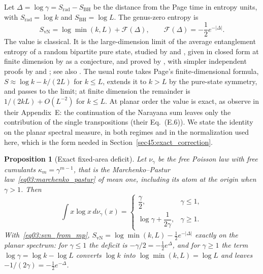 \documentclass[11pt,letterpaper]{article}
\theoremstyle{plain}
\newtheorem{proposition}[theorem]{Proposition}
\theoremstyle{definition}
\theoremstyle{remark}
\begin{document}
Let $\Delta = \log\gamma = S_{\mathrm{rad}} - S_{\mathrm{BH}}$ be the distance from the Page time in entropy units, with $S_{\mathrm{rad}} = \log k$ and $S_{\mathrm{BH}} = \log L$. The genus-zero entropy is
\begin{equation}
\label{eq03:pssy_scaling_function}
S_{\mathrm{vN}} = \log\min(k,L) + \mathcal{F}(\Delta), \qquad
\mathcal{F}(\Delta) = -\frac{1}{2} e^{-|\Delta|} .
\end{equation}
The value is classical. It is the large-dimension limit of the average entanglement entropy of a random bipartite pure state, studied by \citet{lubkin1978} and \citet{lloydpagels1988}, given in closed form at finite dimension by \citet{page1993entropy} as a conjecture, and proved by \citet{foongkanno1994}, with simpler independent proofs by \citet{sanchezruiz1995} and \citet{sen1996}; see also \citet{zyczkowskisommers2001}. The usual route takes Page's finite-dimensional formula, $S \approx \log k - k/(2L)$ for $k \le L$, extends it to $k > L$ by the pure-state symmetry, and passes to the limit; at finite dimension the remainder is $1/(2kL) + O(L^{-2})$ for $k \le L$. At planar order the value is exact, as \citet{pssyetal2022} observe in their Appendix~E: the continuation of the Narayana sum leaves only the contribution of the single transpositions (their Eq.~(E.6)). We state the identity on the planar spectral measure, in both regimes and in the normalization used here, which is the form needed in Section~\ref{sec45:exact_correction}.

\begin{proposition}[Exact fixed-area deficit]
\label{prop03:exact_deficit}
Let $\nu_\gamma$ be the free Poisson law with free cumulants $\kappa_m = \gamma^{m-1}$, that is the Marchenko--Pastur law~\eqref{eq03:marchenko_pastur} of mean one, including its atom at the origin when $\gamma > 1$. Then
\begin{equation}
\label{eq03:mp_entropy_identity}
\int x \log x \, d\nu_\gamma(x) =
\begin{cases}
\dfrac{\gamma}{2}, & \gamma \le 1, \\[2ex]
\log \gamma + \dfrac{1}{2\gamma}, & \gamma \ge 1.
\end{cases}
\end{equation}
With~\eqref{eq03:svn_from_mp}, $S_{\mathrm{vN}} = \log\min(k,L) - \tfrac12 e^{-|\Delta|}$ exactly on the planar spectrum: for $\gamma \le 1$ the deficit is $-\gamma/2 = -\tfrac12 e^{\Delta}$, and for $\gamma \ge 1$ the term $\log\gamma = \log k - \log L$ converts $\log k$ into $\log\min(k,L) = \log L$ and leaves $-1/(2\gamma) = -\tfrac12 e^{-\Delta}$.
\end{proposition}
\end{document}
